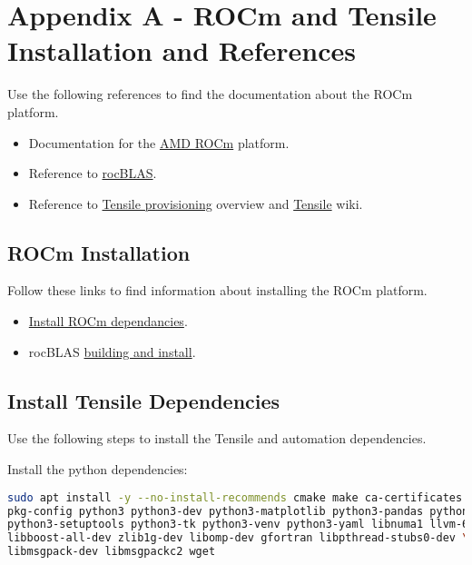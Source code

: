 \documentclass[]{article}
\begin{document}
\section{Appendix A - ROCm and Tensile Installation and References}
\label{sec:appendixA}

Use the following references to find the documentation about the ROCm platform.
\begin{itemize}
	\item Documentation for the \href{https://rocmdocs.amd.com/en/latest/}{AMD ROCm} platform.
	\item Reference to \href{https://rocblas.readthedocs.io/en/latest/intro.html}{rocBLAS}.
	\item Reference to \href{https://github.com/ROCmSoftwarePlatform/Tensile/tree/develop/tuning}{Tensile provisioning} overview and \href{https://github.com/ROCmSoftwarePlatform/Tensile/wiki}{Tensile} wiki.
\end{itemize}

\subsection{ROCm Installation}

Follow these links to find information about installing the ROCm platform. \newline

\begin{itemize}
	\item \href{https://rocmdocs.amd.com/en/latest/Installation_Guide/Installation-Guide.html}{Install ROCm dependancies}.
	\item rocBLAS \href{https://rocblas.readthedocs.io/en/latest/install.html}{building and install}.
\end{itemize}

\subsection{Install Tensile Dependencies}

Use the following steps to install the Tensile and automation dependencies. \newline

\noindent Install the python dependencies:

\begin{lstlisting}[language=bash,breaklines=true]
sudo apt install -y --no-install-recommends cmake make ca-certificates git \
pkg-config python3 python3-dev python3-matplotlib python3-pandas python3-pip \
python3-setuptools python3-tk python3-venv python3-yaml libnuma1 llvm-6.0-dev \
libboost-all-dev zlib1g-dev libomp-dev gfortran libpthread-stubs0-dev \
libmsgpack-dev libmsgpackc2 wget
\end{lstlisting}
\end{document}

